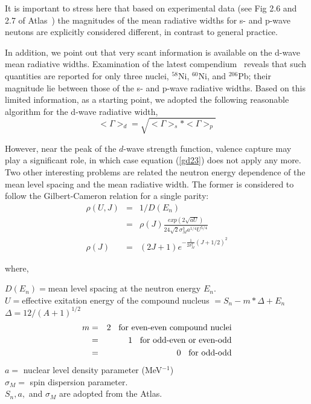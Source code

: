 \documentclass[twocolumn,amsmath,amssymb,10pt,groupedaddress,a4paper]{revtex4}
\begin{document}
It is important to stress here that based on experimental data
(see Fig 2.6 and 2.7 of Atlas~\cite{Mughabghab:06}) the   magnitudes of the  mean radiative
widths for s- and p-wave neutons are explicitly considered different, in contrast
to general practice.

In addition, we point out that very scant information is available on the d-wave  mean
radiative widths.  Examination of the latest compendium~\cite{Mughabghab:06} reveals
that such quantities are reported for only three nuclei, $^{58}$Ni, $^{60}$Ni, and $^{206}$Pb; their
magnitude lie between those of the s- and p-wave radiative widths. Based on this limited information, as a starting point,
we adopted the following reasonable algorithm for the d-wave radiative width,
\begin{equation}
        < \Gamma>_d =  \sqrt{<\Gamma>_s*<\Gamma>_p}
\label{gd23}
\end{equation}

 However, near the peak of the $d$-wave strength function, valence capture may play a significant role, in which
 case equation
(\ref{gd23}) does not apply any more. Two other interesting problems are related the neutron energy dependence
of the mean level
 spacing and the mean radiative width. The former is considered to follow the Gilbert-Cameron
 relation for a single parity:
\begin{eqnarray}
\rho(U,J)&=&1/D(E_n) \nonumber\\
 &=&\rho(J)\frac{exp(2\sqrt{aU})}{24\sqrt{2}\sigma_M^3a^{1/4}U^{5/4}}\\
\rho(J)&=&(2J+1)e^{-\frac{1}{2\sigma_M^2}(J+1/2)^2}
\end{eqnarray}

\noindent where,

$ D(E_n)= $mean level spacing at the neutron energy $E_n$.\\
$U=$effective exitation energy of the compound nucleus $= S_n - m*\Delta +E_n$\\
$\Delta=12/(A+1)^{1/2}$\\
\begin{eqnarray}
m&=&2 \text{\hspace{0.2cm} for even-even compound nuclei}\nonumber\\
    &=&1 \text{\hspace{0.2cm}  for odd-even or even-odd}\nonumber\\
    &=&0 \text{\hspace{0.2cm}  for odd-odd}\nonumber\\
\end{eqnarray}
$a=$ nuclear level density parameter (MeV$^{-1}$)\\
$\sigma_M=$ spin dispersion parameter.\\
$S_n, a,$ and  $\sigma_M$ are adopted from the Atlas.
\end{document}
